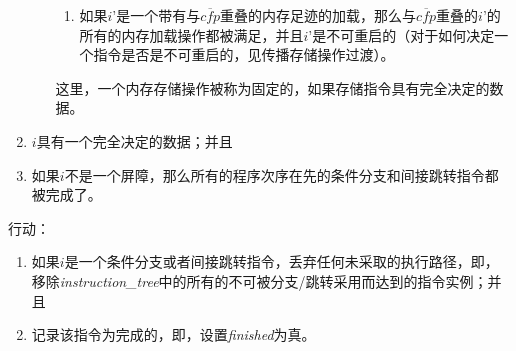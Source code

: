 \begin{enumerate}
\begin{enumerate}
\begin{enumerate}
    \item 如果$i’$是一个带有与$\overline{\textit{cfp}}$重叠的内存足迹的加载，那么与$\overline{\textit{cfp}}$重叠的$i’$的所有的内存加载操作都被满足，并且$i’$是不可重启的（对于如何决定一个指令是否是不可重启的，见传播存储操作过渡）。  
    \end{enumerate}
  这里，一个内存存储操作被称为固定的，如果存储指令具有完全决定的数据。
  \end{enumerate}
\item $i$具有一个完全决定的数据；并且  %
\item 如果$i$不是一个屏障，那么所有的程序次序在先的条件分支和间接跳转指令都被完成了。  %
\end{enumerate}
行动：
\begin{enumerate}
\item 如果$i$是一个条件分支或者间接跳转指令，丢弃任何未采取的执行路径，即，移除{\it instruction\_tree}中的所有的不可被分支/跳转采用而达到的指令实例；并且  %
\item 记录该指令为完成的，即，设置{\it finished}为真。  %
\end{enumerate}


